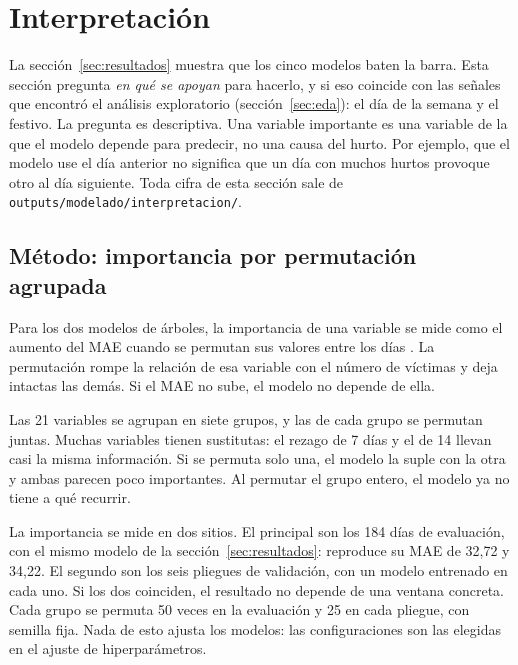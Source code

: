 \section{Interpretación}\label{sec:interpretacion}

La sección~\ref{sec:resultados} muestra que los cinco modelos baten la barra. Esta sección pregunta \emph{en qué se apoyan} para hacerlo, y si eso coincide con las señales que encontró el análisis exploratorio (sección~\ref{sec:eda}): el día de la semana y el festivo. La pregunta es descriptiva. Una variable importante es una variable de la que el modelo depende para predecir, no una causa del hurto. Por ejemplo, que el modelo use el día anterior no significa que un día con muchos hurtos provoque otro al día siguiente. Toda cifra de esta sección sale de \texttt{outputs/\allowbreak{}modelado/\allowbreak{}interpretacion/}.

\subsection{Método: importancia por permutación agrupada}\label{sec:int-metodo}

Para los dos modelos de árboles, la importancia de una variable se mide como el aumento del MAE cuando se permutan sus valores entre los días \citep{breiman2001}. La permutación rompe la relación de esa variable con el número de víctimas y deja intactas las demás. Si el MAE no sube, el modelo no depende de ella.

Las 21 variables se agrupan en siete grupos, y las de cada grupo se permutan juntas. Muchas variables tienen sustitutas: el rezago de 7 días y el de 14 llevan casi la misma información. Si se permuta solo una, el modelo la suple con la otra y ambas parecen poco importantes. Al permutar el grupo entero, el modelo ya no tiene a qué recurrir.

La importancia se mide en dos sitios. El principal son los 184 días de evaluación, con el mismo modelo de la sección~\ref{sec:resultados}: reproduce su MAE de 32,72 y 34,22. El segundo son los seis pliegues de validación, con un modelo entrenado en cada uno. Si los dos coinciden, el resultado no depende de una ventana concreta. Cada grupo se permuta 50 veces en la evaluación y 25 en cada pliegue, con semilla fija. Nada de esto ajusta los modelos: las configuraciones son las elegidas en el ajuste de hiperparámetros.

